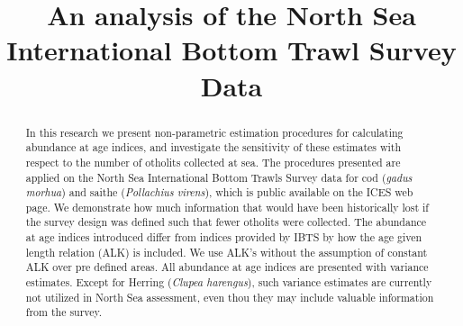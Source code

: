 \documentclass[a4paper 12pt]{article}
\title{\bf 
}
\author{}
\date{}
\numberwithin{equation}{section}
\begin{document}
\title{An analysis of the North Sea International Bottom Trawl Survey Data}

\maketitle


\begin{abstract}
In this research we present non-parametric estimation procedures for calculating abundance at age indices, and investigate the sensitivity of these estimates with respect to the number of otholits collected at sea. The procedures presented are applied on the North Sea International Bottom Trawls Survey data for cod (\textit{gadus morhua}) and saithe (\textit{Pollachius virens}), which is public available on the ICES web page. We demonstrate how much information that would have been historically lost if the survey design was defined such that fewer otholits were collected. The abundance at age indices introduced differ from indices provided by IBTS by how the age given length relation (ALK) is included. We use ALK's without the assumption of constant ALK over pre defined areas. All abundance at age indices are presented with variance estimates. Except for Herring (\textit{Clupea harengus}), such variance estimates are currently not utilized in North Sea assessment, even thou they may include valuable information from the survey.

\end{abstract}
\end{document}
